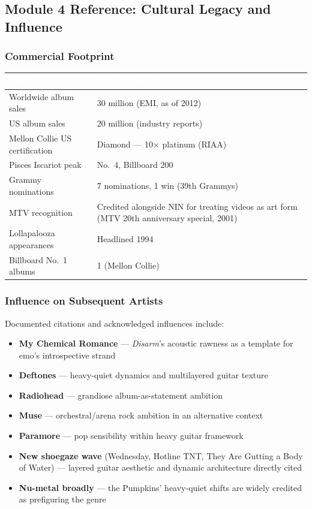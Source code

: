 \documentclass[11pt,letterpaper]{article}
\newcommand{\tableheader}[1]{\textbf{\sffamily\textcolor{white}{#1}}}
\begin{document}
\subsection{Module 4 Reference: Cultural Legacy and Influence}

\subsubsection{Commercial Footprint}

\begin{center}
\begin{tabularx}{\textwidth}{L{5cm}X}
\toprule
{}
\tableheader{Metric} & \tableheader{Data (Source)} \\
\midrule
Worldwide album sales & 30 million (EMI, as of 2012) \\
US album sales & 20 million (industry reports) \\
Mellon Collie US certification & Diamond --- 10$\times$ platinum (RIAA) \\
Pisces Iscariot peak & No.\ 4, Billboard 200 \\
Grammy nominations & 7 nominations, 1 win (39th Grammys) \\
MTV recognition & Credited alongside NIN for treating videos as art form (MTV 20th anniversary special, 2001) \\
Lollapalooza appearances & Headlined 1994 \\
Billboard No.\ 1 albums & 1 (Mellon Collie) \\
\bottomrule
\end{tabularx}
\end{center}

\subsubsection{Influence on Subsequent Artists}

Documented citations and acknowledged influences include:
\begin{itemize}
  \item \textbf{My Chemical Romance} --- \textit{Disarm}'s acoustic rawness as a template for emo's introspective strand
  \item \textbf{Deftones} --- heavy-quiet dynamics and multilayered guitar texture
  \item \textbf{Radiohead} --- grandiose album-as-statement ambition
  \item \textbf{Muse} --- orchestral/arena rock ambition in an alternative context
  \item \textbf{Paramore} --- pop sensibility within heavy guitar framework
  \item \textbf{New shoegaze wave} (Wednesday, Hotline TNT, They Are Gutting a Body of Water) --- layered guitar aesthetic and dynamic architecture directly cited
  \item \textbf{Nu-metal broadly} --- the Pumpkins' heavy-quiet shifts are widely credited as prefiguring the genre
\end{itemize}
\end{document}

